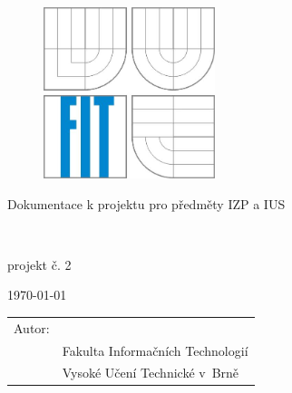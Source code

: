 \begin{titlepage}

\begin{figure}[!h]
  \centering
  \includegraphics[height=5cm]{img/logo.jpg}
\end{figure}

\vfill

\begin{center}
\begin{Large}
Dokumentace k projektu pro předměty IZP a IUS\\
\end{Large}
\bigskip
\begin{Huge}
\projname\\
\end{Huge}
\begin{large}
projekt č. 2
\end{large}
\end{center}

\vfill

\begin{center}
\begin{Large}
\today
\end{Large}
\end{center}

\vfill

\begin{flushleft}
\begin{large}
\begin{tabular}{ll}
Autor: & \author, \url{\email} \\
 & Fakulta Informačních Technologií \\
 & Vysoké Učení Technické v~Brně \\
\end{tabular}
\end{large}
\end{flushleft}
\end{titlepage}
